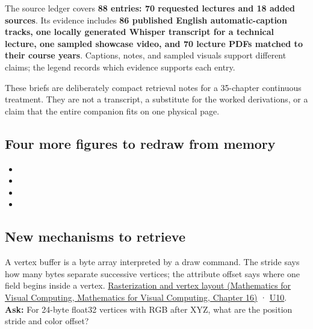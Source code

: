 The source ledger covers \textbf{88 entries: 70 requested lectures and 18 added sources}. Its evidence includes \textbf{86 published English automatic-caption tracks, one locally generated Whisper transcript for a technical lecture, one sampled showcase video, and 70 lecture PDFs matched to their course years}. Captions, notes, and sampled visuals support different claims; the legend records which evidence supports each entry.

These briefs are deliberately compact retrieval notes for a 35-chapter continuous treatment. They are not a transcript, a substitute for the worked derivations, or a claim that the entire companion fits on one physical page.

\subsection{Four more figures to redraw from memory}\label{appendix-a8f634b076b5-four-more-figures-to-redraw-from-memory}

\begin{itemize}
\tightlist
\item
\item
\item
\item
\end{itemize}

\subsection{New mechanisms to retrieve}\label{appendix-a8f634b076b5-new-mechanisms-to-retrieve}

A vertex buffer is a byte array interpreted by a draw command. The stride says how many bytes separate successive vertices; the attribute offset says where one field begins inside a vertex. \href{../02-Mathematics-for-Visual-Computing/main.pdf\#nameddest=03-visual-computing-i-ch012-rasterization-coverage-and-depth}{Rasterization and vertex layout (Mathematics for Visual Computing, Mathematics for Visual Computing, Chapter 16)} · \hyperref[03-visual-computing-i-ch018-figure-u10---vertex-fetch-uses-a-stride-and-byte-offset]{U10}. \textbf{Ask:} For 24-byte float32 vertices with RGB after XYZ, what are the position stride and color offset?

